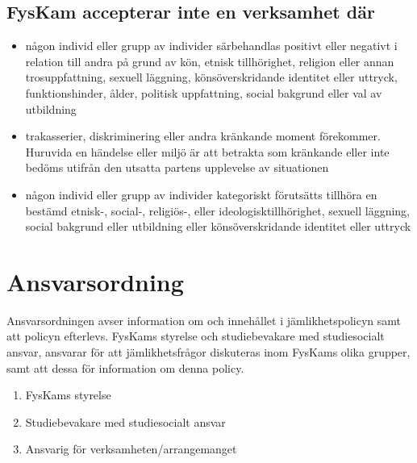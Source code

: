 \documentclass{../resources/dgovdoc}
\begin{document}
\subsection{FysKam accepterar inte en verksamhet där}

\begin{itemize}
\item någon individ eller grupp av individer särbehandlas positivt eller negativt i
relation till andra på grund av kön, etnisk tillhörighet, religion eller annan
trosuppfattning, sexuell läggning, könsöverskridande identitet eller uttryck,
funktionshinder, ålder, politisk uppfattning, social bakgrund eller val av
utbildning
\item trakasserier, diskriminering eller andra kränkande moment förekommer.
Huruvida en händelse eller miljö är att betrakta som kränkande eller inte
bedöms utifrån den utsatta partens upplevelse av situationen
\item någon individ eller grupp av individer kategoriskt förutsätts tillhöra en bestämd
etnisk-, social-, religiös-, eller ideologisktillhörighet, sexuell läggning, social
bakgrund eller utbildning eller könsöverskridande identitet eller uttryck
\end{itemize}

\section{Ansvarsordning}

Ansvarsordningen avser information om och innehållet i jämlikhetspolicyn samt att
policyn efterlevs.
FysKams styrelse och studiebevakare med studiesocialt ansvar, ansvarar för att
jämlikhetsfrågor diskuteras inom FysKams olika grupper, samt att dessa för information
om denna policy.

\begin{enumerate}
\item FysKams styrelse
\item Studiebevakare med studiesocialt ansvar
\item Ansvarig för verksamheten/arrangemanget
\end{enumerate}
\end{document}
